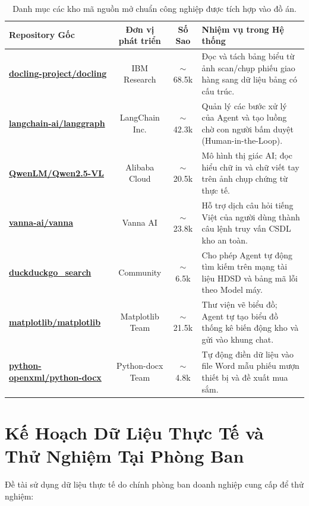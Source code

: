 \documentclass[11pt,a4paper]{article}
\begin{document}
\begin{table}[H]
\centering
\small
\renewcommand{\arraystretch}{1.15}
\begin{tabularx}{\textwidth}{l c c >{\raggedright\arraybackslash}X}
\toprule
\textbf{Repository Gốc} & \textbf{Đơn vị phát triển} & \textbf{Số Sao} & \textbf{Nhiệm vụ trong Hệ thống} \\
\midrule
\href{https://github.com/docling-project/docling}{\textbf{docling-project/docling}} & IBM Research & $\sim$68.5k & Đọc và tách bảng biểu từ ảnh scan/chụp phiếu giao hàng sang dữ liệu bảng có cấu trúc. \\
\href{https://github.com/langchain-ai/langgraph}{\textbf{langchain-ai/langgraph}} & LangChain Inc. & $\sim$42.3k & Quản lý các bước xử lý của Agent và tạo luồng chờ con người bấm duyệt (Human-in-the-Loop). \\
\href{https://github.com/QwenLM/Qwen2.5-VL}{\textbf{QwenLM/Qwen2.5-VL}} & Alibaba Cloud & $\sim$20.5k & Mô hình thị giác AI; đọc hiểu chữ in và chữ viết tay trên ảnh chụp chứng từ thực tế. \\
\href{https://github.com/vanna-ai/vanna}{\textbf{vanna-ai/vanna}} & Vanna AI & $\sim$23.8k & Hỗ trợ dịch câu hỏi tiếng Việt của người dùng thành câu lệnh truy vấn CSDL kho an toàn. \\
\href{https://github.com/deedy5/duckduckgo_search}{\textbf{duckduckgo\_search}} & Community & $\sim$6.5k & Cho phép Agent tự động tìm kiếm trên mạng tài liệu HDSD và bảng mã lỗi theo Model máy. \\
\href{https://github.com/matplotlib/matplotlib}{\textbf{matplotlib/matplotlib}} & Matplotlib Team & $\sim$21.5k & Thư viện vẽ biểu đồ; Agent tự tạo biểu đồ thống kê biến động kho và gửi vào khung chat. \\
\href{https://github.com/python-openxml/python-docx}{\textbf{python-openxml/python-docx}} & Python-docx Team & $\sim$4.8k & Tự động điền dữ liệu vào file Word mẫu phiếu mượn thiết bị và đề xuất mua sắm. \\
\bottomrule
\end{tabularx}
\caption{Danh mục các kho mã nguồn mở chuẩn công nghiệp được tích hợp vào đồ án.}
\end{table}

\section{Kế Hoạch Dữ Liệu Thực Tế và Thử Nghiệm Tại Phòng Ban}

Đề tài sử dụng dữ liệu thực tế do chính phòng ban doanh nghiệp cung cấp để thử nghiệm:
\end{document}
